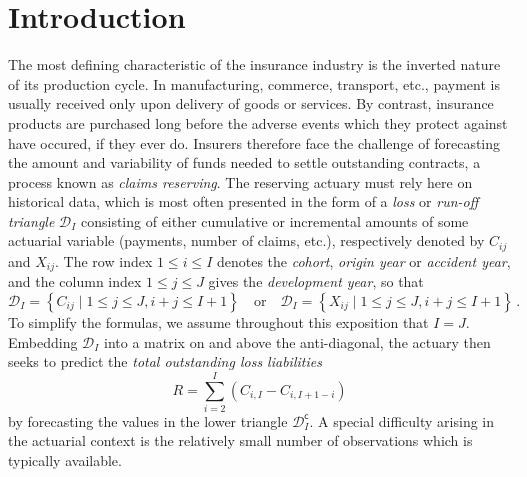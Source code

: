 \documentclass[a4paper]{book}
\begin{document}
\tableofcontents%
\listoftables%
\listoffigures%

\printnomenclature%

\mainmatter%

\chapter{Introduction} \label{chapter:intro}

The most defining characteristic of the insurance industry is the inverted nature of its production cycle. In manufacturing, commerce, transport, etc., payment is usually received only upon delivery of goods or services. By contrast, insurance products are purchased long before the adverse events which they protect against have occured, if they ever do. Insurers therefore face the challenge of forecasting the amount and variability of funds needed to settle outstanding contracts, a process known as \emph{claims reserving}. The reserving actuary must rely here on historical data, which is most often presented in the form of a \emph{loss} or \emph{run-off triangle} $\mathcal{D}_I$ consisting of either cumulative or incremental amounts of some actuarial variable (payments, number of claims, etc.), respectively denoted by $C_{ij}$ and $X_{ij}$. The row index $1 \leq i \leq I$ denotes the \emph{cohort}, \emph{origin year} or \emph {accident year}, and the column index $1 \leq j \leq J$ gives the \emph{development year}, so that
\begin{equation}
  \mathcal{D}_I = \left  \{ C_{ij} \mid 1 \leq j \leq J, i + j \leq I + 1 \right \}
  \quad \text{or} \quad
  \mathcal{D}_I = \left  \{ X_{ij} \mid 1 \leq j \leq J, i + j \leq I + 1 \right \} \,.
\end{equation}
To simplify the formulas, we assume throughout this exposition that $I = J$. Embedding $\mathcal{D}_I$ into a matrix on and above the anti-diagonal, the actuary then seeks to predict the \emph{total outstanding loss liabilities}
\begin{equation}
  R = \sum_{i = 2}^I (C_{i, I} - C_{i, I + 1- i})
\end{equation}
by forecasting the values in the lower triangle $\mathcal{D}^{\mathsf{c}}_I$. A special difficulty arising in the actuarial context is the relatively small number of observations which is typically available.
\end{document}

